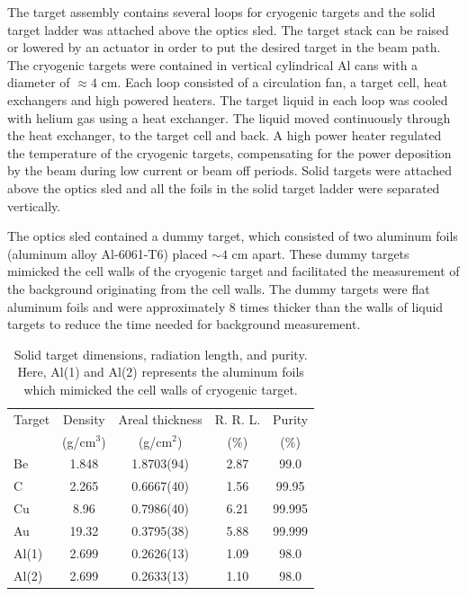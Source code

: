 The target assembly contains several loops for cryogenic targets and the solid
target ladder was attached above the optics sled. The target stack can be
raised or lowered by an actuator in order to put the desired target in the
beam path. The cryogenic targets were contained in vertical cylindrical Al cans
with a diameter of $\approx 4$ cm. Each loop consisted of a circulation fan, a
target cell, heat exchangers and high powered heaters. The target liquid in
each loop was cooled with helium gas using a heat exchanger. The liquid moved
continuously through the heat exchanger, to the target cell and back. A high
power heater regulated the temperature of the cryogenic targets, compensating
for the power deposition by the beam during low current or beam off periods.
Solid targets were attached above the optics sled and all the foils in the
solid target ladder were separated vertically.

The optics sled contained a dummy target, which consisted of two aluminum
foils (aluminum alloy Al-6061-T6) placed $\sim4$ cm apart. These dummy targets
mimicked the cell walls of the cryogenic target and facilitated the
measurement of the background originating from the cell walls. The dummy
targets were flat aluminum foils and were approximately 8 times thicker than
the walls of liquid targets to reduce the time needed for background
measurement.


\begin{table}[htb]
\begin{center}
\caption{Solid target dimensions, radiation length, and purity. Here, Al(1)
and Al(2) represents the aluminum foils which mimicked the cell walls of
cryogenic target.}
\label{solidltarthick_tab}
\begin{tabular}{|l|c|c|c|c|}
\hline
Target & Density &Areal thickness & R. R. L. & Purity\\ 
& (g/cm$^3$) & (g/cm$^2$) &($\%$) & ($\%$)\\
\hline
Be    & 1.848 & 1.8703(94) & 2.87 & 99.0 \\
C     & 2.265 & 0.6667(40) & 1.56 & 99.95\\
Cu    & 8.96  & 0.7986(40) & 6.21 & 99.995 \\
Au    & 19.32 & 0.3795(38) & 5.88 & 99.999\\
Al(1) & 2.699 & 0.2626(13) & 1.09 & 98.0\\
Al(2) & 2.699 & 0.2633(13) & 1.10 & 98.0\\
\hline
\end{tabular}
\end{center}
\end{table}


